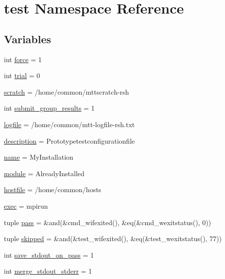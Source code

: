 \hypertarget{namespacetest}{\section{test Namespace Reference}
\label{namespacetest}
}
\subsection*{Variables}
\begin{DoxyCompactItemize}
\item 
int \hyperlink{namespacetest_ad4773f49ae244cf1cfa3fe9cbbce0d67}{force} = 1
\item 
int \hyperlink{namespacetest_a0e85c866c38cad5d7ae36d1115224da0}{trial} = 0
\item 
\hyperlink{namespacetest_aab6125cbc3654cbeb0f5df11bf28b3f1}{scratch} = /home/common/mttscratch-\/rsh
\item 
int \hyperlink{namespacetest_afa4c185ba5d92fdbefba5736ef442945}{submit\-\_\-group\-\_\-results} = 1
\item 
\hyperlink{namespacetest_ad95cf6979c5decba613e5a1d5ffe07a7}{logfile} = /home/common/mtt-\/logfile-\/rsh.\-txt
\item 
\hyperlink{namespacetest_a1c2a3a63faa9854257983fbb3de9e11d}{description} = Prototypetestconfigurationfile
\item 
\hyperlink{namespacetest_ac5ddc75d7029ace1bfb95e457e5c3510}{name} = My\-Installation
\item 
\hyperlink{namespacetest_ab75fa7ca9f0cb2bcac8a454434a9f2ed}{module} = Already\-Installed
\item 
\hyperlink{namespacetest_aa7f544791c7eba91f19e926b661617a1}{hostfile} = /home/common/hosts
\item 
\hyperlink{namespacetest_a306f9d9d5c20138c75077ea9bb2b2df4}{exec} = mpirun
\item 
tuple \hyperlink{namespacetest_abc155792ba7b2057124cc069e596899f}{pass} = \&and(\&cmd\-\_\-wifexited(), \&eq(\&cmd\-\_\-wexitstatus(), 0))
\item 
tuple \hyperlink{namespacetest_a7a09931cf523b8af2e201bee605f000c}{skipped} = \&and(\&test\-\_\-wifexited(), \&eq(\&test\-\_\-wexitstatus(), 77))
\item 
int \hyperlink{namespacetest_ad6c2143462bf99c62dcb7cf691a56394}{save\-\_\-stdout\-\_\-on\-\_\-pass} = 1
\item 
int \hyperlink{namespacetest_ab42f6c72b039645ef575cfb31b7b99e8}{merge\-\_\-stdout\-\_\-stderr} = 1
\item 

\end{DoxyCompactItemize}

